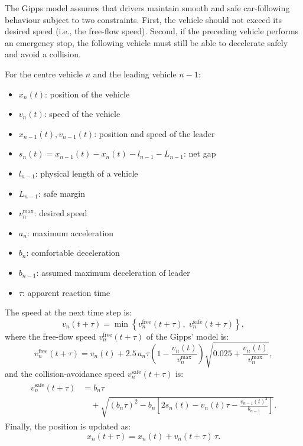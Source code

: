 \documentclass[journal]{IEEEtran}
\begin{document}
The Gipps model assumes that drivers maintain smooth and safe car-following behaviour subject to two constraints. First, the vehicle should not exceed its desired speed (i.e., the free-flow speed). Second, if the preceding vehicle performs an emergency stop, the following vehicle must still be able to decelerate safely and avoid a collision.

For the centre vehicle $n$ and the leading vehicle $n-1$:
\begin{itemize}
    \item $x_n(t)$: position of the vehicle
    \item $v_n(t)$: speed of the vehicle
    \item $x_{n-1}(t), v_{n-1}(t)$: position and speed of the leader
    \item $s_n(t) = x_{n-1}(t) - x_n(t) - l_{n-1} - L_{n-1}$: net gap
    \item $l_{n-1}$: physical length of a vehicle
    \item $L_{n-1}$: safe margin
    \item $v_n^{\max}$: desired speed
    \item $a_n$: maximum acceleration
    \item $b_n$: comfortable deceleration
    \item $b_{n-1}$: assumed maximum deceleration of leader
    \item $\tau$: apparent reaction time
\end{itemize}
The speed at the next time step is:
\begin{equation}\label{eq:gippsMin}
v_n(t+\tau) = \min \left\{ v_n^{\text{free}}(t+\tau),\; v_n^{\text{safe}}(t+\tau) \right\},
\end{equation}
where the free-flow speed $v_n^{\text{free}}(t+\tau)$ of the Gipps' model is:
\begin{equation}\label{eq:gippsFF}
v_n^{\text{free}}(t+\tau)=v_n(t)+2.5\, a_n \tau\left(1 - \frac{v_n(t)}{v_n^{\max}}\right)\sqrt{0.025 +\frac{v_n(t)}{v_n^{\max}}},
\end{equation}
and the collision-avoidance speed $v_n^{\text{safe}}(t+\tau)$ is:
\begin{align}\label{eq:gippsCA}
\begin{split}
v_n^{\text{safe}}(t+\tau)&=b_n \tau \\ &\quad + \sqrt{(b_n \tau)^2-b_n\left[2 s_n(t)-v_n(t)\tau-\frac{v_{n-1}(t)^2}{b_{n-1}}\right]}.
\end{split}
\end{align}
Finally, the position is updated as:
\begin{equation}\label{eq:gippsUpdate}
x_n(t+\tau) = x_n(t) + v_n(t+\tau)\,\tau.
\end{equation}
\end{document}
